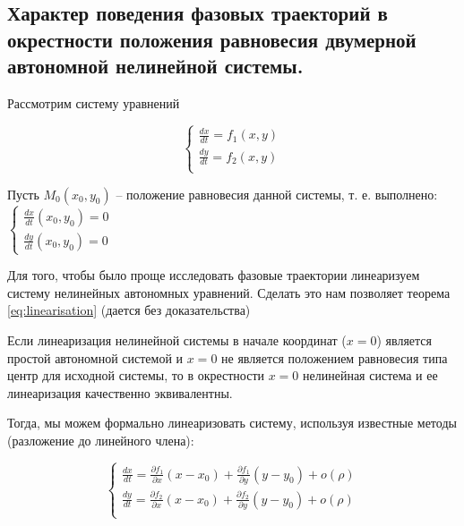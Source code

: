 
\subsection{Характер поведения фазовых траекторий в окрестности положения равновесия двумерной автономной нелинейной системы.}

Рассмотрим систему уравнений

\begin{equation}
  \begin{cases}
    \frac{d x}{d t} = f_1 (x, y) \\
    \frac{d y}{d t} = f_2 (x, y) \\
  \end{cases} 
\end{equation}

Пусть $M_0(x_0, y_0)$ -- положение равновесия данной системы, т. е. выполнено:
$\begin{cases}
  \frac{d x}{d t}(x_0, y_0) = 0 \\
  \frac{d y}{d t}(x_0, y_0) = 0
\end{cases}$

Для того, чтобы было проще исследовать фазовые траектории линеаризуем систему нелинейных автономных уравнений. Сделать это нам позволяет теорема \eqref{eq:linearisation} (дается без доказательства)

\begin{theorem} \label{eq:linearisation}
  Если линеаризация нелинейной системы в начале координат ($x = 0$) является простой автономной системой и $x = 0$ не является положением равновесия типа центр для исходной системы, то в окрестности $x = 0$ нелинейная система и ее линеаризация качественно эквивалентны.
\end{theorem}

Тогда, мы можем формально линеаризовать систему, используя известные методы (разложение до линейного члена):

\begin{equation}
  \begin{cases}
    \frac{d x}{d t} = \frac{\partial f_1}{\partial x} (x - x_0) + \frac{\partial f_1}{\partial y} (y - y_0) + o(\rho) \\
    \frac{d y}{d t} = \frac{\partial f_2}{\partial x} (x - x_0) + \frac{\partial f_2}{\partial y} (y - y_0) + o(\rho) \\        
  \end{cases}
\end{equation}

